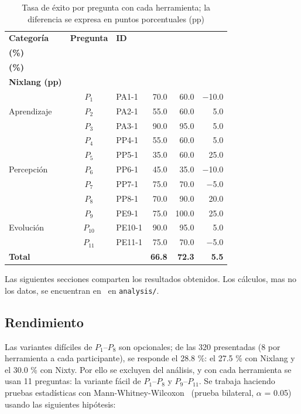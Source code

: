 \begin{table}[htbp]
\centering
\setlength{\tabcolsep}{4pt}
\begin{tabular}{|l|c|l|r|r|r|}
\hline
\textbf{Categoría} & \textbf{Pregunta} & \textbf{ID} & \makecell[r]{\textbf{Nixlang} \\ \textbf{(\%)}} & \makecell[r]{\textbf{Nixty} \\ \textbf{(\%)}} & \makecell[r]{\textbf{Nixty $-$} \\ \textbf{Nixlang (pp)}} \\
\hline
\multirow{3}{*}{Aprendizaje} & $P_1$ & PA1-1 & 70.0 & 60.0 & $-$10.0 \\
\cline{2-6}
 & $P_2$ & PA2-1 & 55.0 & 60.0 & 5.0 \\
\cline{2-6}
 & $P_3$ & PA3-1 & 90.0 & 95.0 & 5.0 \\
\hline
\multirow{5}{*}{Percepción} & $P_4$ & PP4-1 & 55.0 & 60.0 & 5.0 \\
\cline{2-6}
 & $P_5$ & PP5-1 & 35.0 & 60.0 & 25.0 \\
\cline{2-6}
 & $P_6$ & PP6-1 & 45.0 & 35.0 & $-$10.0 \\
\cline{2-6}
 & $P_7$ & PP7-1 & 75.0 & 70.0 & $-$5.0 \\
\cline{2-6}
 & $P_8$ & PP8-1 & 70.0 & 90.0 & 20.0 \\
\hline
\multirow{3}{*}{Evolución} & $P_9$ & PE9-1 & 75.0 & 100.0 & 25.0 \\
\cline{2-6}
 & $P_{10}$ & PE10-1 & 90.0 & 95.0 & 5.0 \\
\cline{2-6}
 & $P_{11}$ & PE11-1 & 75.0 & 70.0 & $-$5.0 \\
\hline
\multicolumn{3}{|l|}{\textbf{Total}} & \textbf{66.8} & \textbf{72.3} & \textbf{5.5} \\
\hline
\end{tabular}
\caption{Tasa de éxito por pregunta con cada herramienta; la diferencia se expresa en puntos porcentuales (pp)}
\label{cuadro-preguntas}
\end{table}

Las siguientes secciones comparten los resultados obtenidos. Los cálculos, mas no los datos, se encuentran en~\cite{rayoNixEveryoneRepository} en \texttt{analysis/}.

\subsection{Rendimiento}

Las variantes difíciles de $P_1$--$P_8$ son opcionales; de las 320 presentadas (8 por herramienta a cada participante), se responde el 28.8 \%: el 27.5 \% con Nixlang y el 30.0 \% con Nixty. Por ello se excluyen del análisis, y con cada herramienta se usan 11 preguntas: la variante fácil de $P_1$--$P_8$ y $P_9$--$P_{11}$. Se trabaja haciendo pruebas estadísticas con Mann-Whitney-Wilcoxon~\cite{koch328NoteUse1972} (prueba bilateral, $\alpha$ = 0.05) usando las siguientes hipótesis:

